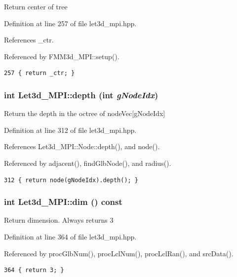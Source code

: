 Return center of tree 

Definition at line 257 of file let3d\_\-mpi.hpp.

References \_\-ctr.

Referenced by FMM3d\_\-MPI::setup().

\footnotesize\begin{verbatim}257 { return _ctr; }
\end{verbatim}\normalsize 


\subsubsection{\setlength{\rightskip}{0pt plus 5cm}int Let3d\_\-MPI::depth (int {\em g\-Node\-Idx})\hspace{0.3cm}{\tt  [inline]}}\label{classLet3d__MPI_365114de1453e803d05b02702d1e0bc2_365114de1453e803d05b02702d1e0bc2}


Return the depth in the octree of node\-Vec[g\-Node\-Idx] 

Definition at line 312 of file let3d\_\-mpi.hpp.

References Let3d\_\-MPI::Node::depth(), and node().

Referenced by adjacent(), find\-Glb\-Node(), and radius().

\footnotesize\begin{verbatim}312 { return node(gNodeIdx).depth(); }
\end{verbatim}\normalsize 


\subsubsection{\setlength{\rightskip}{0pt plus 5cm}int Let3d\_\-MPI::dim () const\hspace{0.3cm}{\tt  [inline]}}\label{classLet3d__MPI_3b54adb16617f4dccdd399f842f3f6bf_3b54adb16617f4dccdd399f842f3f6bf}


Return dimension. Always returns 3 

Definition at line 364 of file let3d\_\-mpi.hpp.

Referenced by proc\-Glb\-Num(), proc\-Lcl\-Num(), proc\-Lcl\-Ran(), and src\-Data().

\footnotesize\begin{verbatim}364 { return 3; }
\end{verbatim}\normalsize 


